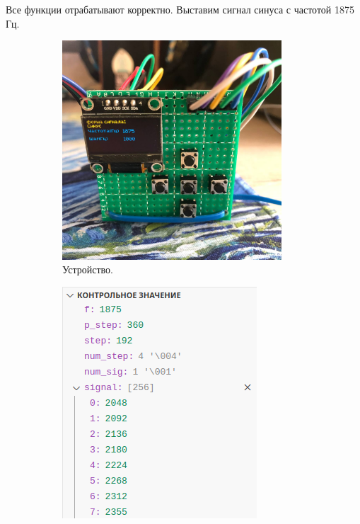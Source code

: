 %	
%	
%	

	Все функции отрабатывают корректно. Выставим сигнал синуса с частотой 1875 Гц.
	
	\begin{figure}[H]
     \begin{subfigure}[H]{0.5\textwidth}
         \centering
         \includegraphics[width=0.9\textwidth]{../image/test4_u_f.jpg}
         \caption{Устройство.}
    	\end{subfigure}
     \hfill
     \begin{subfigure}[H]{0.5\textwidth}
         \centering
         \includegraphics[width=0.8\textwidth]{../image/test4_o_f.png}

\end{subfigure}
\end{figure}
